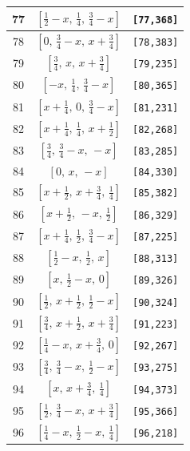 \documentclass[fleqn,8pt]{jsarticle}
\begin{document}
\begin{longtable}{ccc}
77 & $\left[ \frac{1}{2} - x,\, \frac{1}{4},\, \frac{3}{4} - x \right]$ & {\tt [77,368]} \\ \hline
78 & $\left[ 0,\, \frac{3}{4} - x,\, x + \frac{3}{4} \right]$ & {\tt [78,383]} \\ \hline
79 & $\left[ \frac{3}{4},\, x,\, x + \frac{3}{4} \right]$ & {\tt [79,235]} \\ \hline
80 & $\left[ - x,\, \frac{1}{4},\, \frac{3}{4} - x \right]$ & {\tt [80,365]} \\ \hline
81 & $\left[ x + \frac{1}{4},\, 0,\, \frac{3}{4} - x \right]$ & {\tt [81,231]} \\ \hline
82 & $\left[ x + \frac{1}{4},\, \frac{1}{4},\, x + \frac{1}{2} \right]$ & {\tt [82,268]} \\ \hline
83 & $\left[ \frac{3}{4},\, \frac{3}{4} - x,\, - x \right]$ & {\tt [83,285]} \\ \hline
84 & $\left[ 0,\, x,\, - x \right]$ & {\tt [84,330]} \\ \hline
85 & $\left[ x + \frac{1}{2},\, x + \frac{3}{4},\, \frac{1}{4} \right]$ & {\tt [85,382]} \\ \hline
86 & $\left[ x + \frac{1}{2},\, - x,\, \frac{1}{2} \right]$ & {\tt [86,329]} \\ \hline
87 & $\left[ x + \frac{1}{4},\, \frac{1}{2},\, \frac{3}{4} - x \right]$ & {\tt [87,225]} \\ \hline
88 & $\left[ \frac{1}{2} - x,\, \frac{1}{2},\, x \right]$ & {\tt [88,313]} \\ \hline
89 & $\left[ x,\, \frac{1}{2} - x,\, 0 \right]$ & {\tt [89,326]} \\ \hline
90 & $\left[ \frac{1}{2},\, x + \frac{1}{2},\, \frac{1}{2} - x \right]$ & {\tt [90,324]} \\ \hline
91 & $\left[ \frac{3}{4},\, x + \frac{1}{2},\, x + \frac{3}{4} \right]$ & {\tt [91,223]} \\ \hline
92 & $\left[ \frac{1}{4} - x,\, x + \frac{3}{4},\, 0 \right]$ & {\tt [92,267]} \\ \hline
93 & $\left[ \frac{3}{4},\, \frac{3}{4} - x,\, \frac{1}{2} - x \right]$ & {\tt [93,275]} \\ \hline
94 & $\left[ x,\, x + \frac{3}{4},\, \frac{1}{4} \right]$ & {\tt [94,373]} \\ \hline
95 & $\left[ \frac{1}{2},\, \frac{3}{4} - x,\, x + \frac{3}{4} \right]$ & {\tt [95,366]} \\ \hline
96 & $\left[ \frac{1}{4} - x,\, \frac{1}{2} - x,\, \frac{1}{4} \right]$ & {\tt [96,218]} \\ \hline

\end{longtable}
\end{document}
